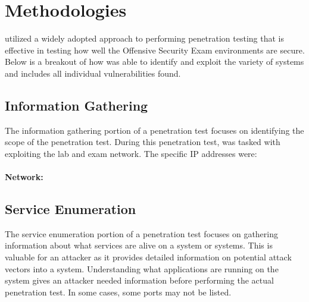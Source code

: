 \section{Methodologies}
{\firstname} utilized a widely adopted approach to performing penetration testing that is effective in testing
how well the Offensive Security Exam environments are secure. Below is a breakout of how {\firstname} was
able to identify and exploit the variety of systems and includes all individual vulnerabilities found.

\subsection{Information Gathering}
The information gathering portion of a penetration test focuses on identifying the scope of the
penetration test. During this penetration test, {\firstname} was tasked with exploiting the lab and exam
network. The specific IP addresses were:

\paragraph{Network:}
\ipaddresses

\subsection{Service Enumeration}
The service enumeration portion of a penetration test focuses on gathering information about what
services are alive on a system or systems. This is valuable for an attacker as it provides detailed
information on potential attack vectors into a system. Understanding what applications are running on
the system gives an attacker needed information before performing the actual penetration test. In
some cases, some ports may not be listed.

